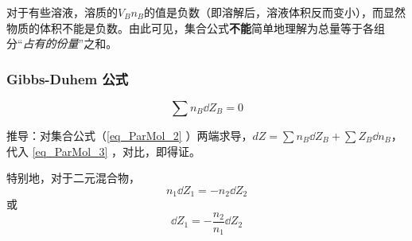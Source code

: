 对于有些溶液，溶质的${V_B}n_B$的值是负数（即溶解后，溶液体积反而变小），而显然物质的体积不能是负数。由此可见，集合公式\textbf{不能}简单地理解为总量等于各组分“\textsl{占有的份量}”之和。

\subsubsection{Gibbs-Duhem 公式}
\begin{equation}
\sum n_B \dd Z_B = 0
\end{equation}

推导：对集合公式（\autoref{eq_ParMol_2} ）两端求导，$dZ=\sum n_B \dd Z_B + \sum {Z_B}  \dd n_B$，代入 \autoref{eq_ParMol_3} ，对比，即得证。

特别地，对于二元混合物，
\begin{equation}
n_1 \dd {Z_1} = - n_2 \dd {Z_2}
\end{equation}
或
\begin{equation}
\dd {Z_1} = -\frac{n_2}{n_1} \dd {Z_2}
\end{equation}


